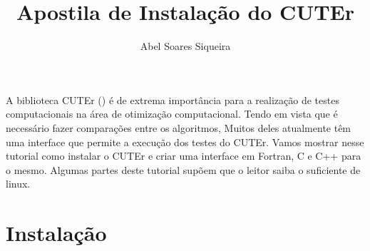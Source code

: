 \documentclass[letterpaper,11pt]{article}
\title{Apostila de Instalação do CUTEr}
\author{Abel Soares Siqueira}
\numberwithin{equation}{section}
\begin{document}
\maketitle

A biblioteca CUTEr (\cite{bib:cuter1,bib:cuter2}) é de extrema importância para a
realização de testes computacionais na área de otimização computacional. 
Tendo em vista que é necessário fazer comparações entre os algoritmos,
Muitos deles atualmente têm uma interface que permite a execução dos testes
do CUTEr. Vamos mostrar nesse tutorial como instalar o CUTEr e criar uma interface
em Fortran, C e C++ para o mesmo. Algumas partes deste tutorial supõem que o leitor
saiba o suficiente de linux.

\section{Instalação}
\end{document}
